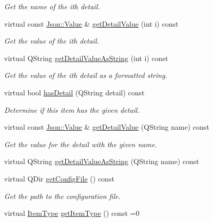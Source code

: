 \begin{DoxyCompactItemize}
\begin{DoxyCompactList}\small\item\em Get the name of the {\ttfamily i}th detail. \end{DoxyCompactList}\item 
virtual const \hyperlink{class_json_1_1_value}{Json\-::\-Value} \& \hyperlink{class_a_w_e_1_1_media_item_adf67ef0cedbe01f026dae1ed5afb42f8}{get\-Detail\-Value} (int i) const 
\begin{DoxyCompactList}\small\item\em Get the value of the {\ttfamily i}th detail. \end{DoxyCompactList}\item 
virtual Q\-String \hyperlink{class_a_w_e_1_1_media_item_a1a913bb927429b63993cf9be26b4a6a9}{get\-Detail\-Value\-As\-String} (int i) const 
\begin{DoxyCompactList}\small\item\em Get the value of the {\ttfamily i}th detail as a formatted string. \end{DoxyCompactList}\item 
virtual bool \hyperlink{class_a_w_e_1_1_media_item_abc781158a6bde5c596a79004326b8a6d}{has\-Detail} (Q\-String detail) const 
\begin{DoxyCompactList}\small\item\em Determine if this item has the given detail. \end{DoxyCompactList}\item 
virtual const \hyperlink{class_json_1_1_value}{Json\-::\-Value} \& \hyperlink{class_a_w_e_1_1_media_item_a394ca8d5847fc28127d5f8f1cbdff019}{get\-Detail\-Value} (Q\-String name) const 
\begin{DoxyCompactList}\small\item\em Get the value for the detail with the given name. \end{DoxyCompactList}\item 
virtual Q\-String \hyperlink{class_a_w_e_1_1_media_item_a8faf4e51f5e8da6b7a2188166702a9ab}{get\-Detail\-Value\-As\-String} (Q\-String name) const 
\item 
virtual Q\-Dir \hyperlink{class_a_w_e_1_1_media_item_a2844063c68e08ddbe58489cc6ef9ea41}{get\-Config\-File} () const 
\begin{DoxyCompactList}\small\item\em Get the path to the configuration file. \end{DoxyCompactList}\item 
virtual \hyperlink{namespace_a_w_e_ad175a5b8a86bf7848825c9bd94c41470}{Item\-Type} \hyperlink{class_a_w_e_1_1_media_item_ad7a7ef28069986fad8b2be060fef6e48}{get\-Item\-Type} () const =0

\end{DoxyCompactItemize}
